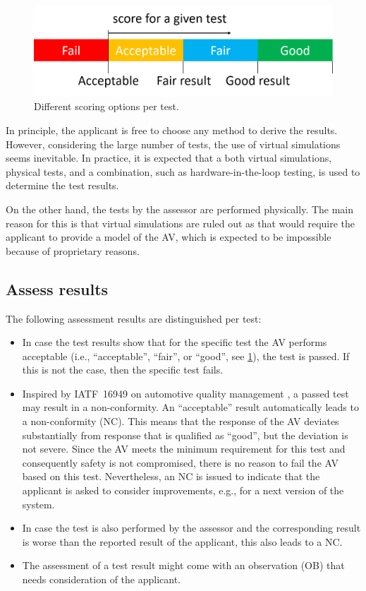 \begin{figure}
	\centering
	\includegraphics[width=\linewidth]{figures/rating}
	\caption{Different scoring options per test.}
	\label{fig:rating}
\end{figure}

In principle, the applicant is free to choose any method to derive the results. However, considering the large number of tests, the use of virtual simulations seems inevitable. In practice, it is expected that a both virtual simulations, physical tests, and a combination, such as hardware-in-the-loop testing, is used to determine the test results.

On the other hand, the tests by the assessor are performed physically. The main reason for this is that virtual simulations are ruled out as that would require the applicant to provide a model of the AV, which is expected to be impossible because of proprietary reasons.



\subsection{Assess results}
\label{sec:assess results}

The following assessment results are distinguished per test:
\begin{itemize}
	\item In case the test results show that for the specific test the AV performs acceptable (i.e., ``acceptable'', ``fair'', or ``good'', see \cref{fig:rating}), the test is passed. If this is not the case, then the specific test fails.
	\item Inspired by IATF~16949 on automotive quality management \autocite{IATF16949}, a passed test may result in a non-conformity. An “acceptable” result automatically leads to a non-conformity (NC). This means that the response of the AV deviates substantially from  response that is qualified as “good”, but the deviation is not severe. Since the AV meets the minimum requirement for this test and consequently safety is not compromised, there is no reason to fail the AV based on this test. Nevertheless, an NC is issued to indicate that the applicant is asked to consider improvements, e.g., for a next version of the system.
	\item In case the test is also performed by the assessor and the corresponding result is worse than the reported result of the applicant, this also leads to a NC.
	\item The assessment of a test result might come with an observation (OB) that needs consideration of the applicant. 
\end{itemize}


